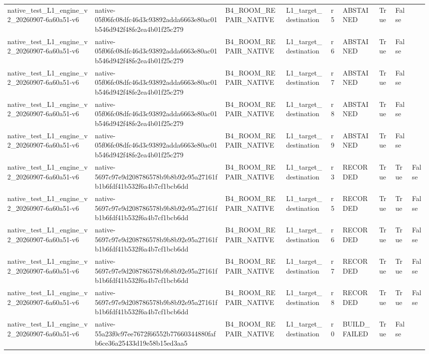 \begin{tabular}{lllllllll}
native\_test\_L1\_engine\_v2\_20260907-6a60a51-v6 & native-05f06fc08dfc46d3c93892adda6663e80ac01b546d942f48fe2ea4b01f25c279 & B4\_ROOM\_REPAIR\_NATIVE & L1\_target\_destination & r5 & ABSTAINED & True & False &  \\
native\_test\_L1\_engine\_v2\_20260907-6a60a51-v6 & native-05f06fc08dfc46d3c93892adda6663e80ac01b546d942f48fe2ea4b01f25c279 & B4\_ROOM\_REPAIR\_NATIVE & L1\_target\_destination & r6 & ABSTAINED & True & False &  \\
native\_test\_L1\_engine\_v2\_20260907-6a60a51-v6 & native-05f06fc08dfc46d3c93892adda6663e80ac01b546d942f48fe2ea4b01f25c279 & B4\_ROOM\_REPAIR\_NATIVE & L1\_target\_destination & r7 & ABSTAINED & True & False &  \\
native\_test\_L1\_engine\_v2\_20260907-6a60a51-v6 & native-05f06fc08dfc46d3c93892adda6663e80ac01b546d942f48fe2ea4b01f25c279 & B4\_ROOM\_REPAIR\_NATIVE & L1\_target\_destination & r8 & ABSTAINED & True & False &  \\
native\_test\_L1\_engine\_v2\_20260907-6a60a51-v6 & native-05f06fc08dfc46d3c93892adda6663e80ac01b546d942f48fe2ea4b01f25c279 & B4\_ROOM\_REPAIR\_NATIVE & L1\_target\_destination & r9 & ABSTAINED & True & False &  \\
native\_test\_L1\_engine\_v2\_20260907-6a60a51-v6 & native-5697c97e9d208786578b9b8b92e95a27161fb1b6fdf41b532f6a4b7cf1bcb6dd & B4\_ROOM\_REPAIR\_NATIVE & L1\_target\_destination & r3 & RECORDED & True & True & False \\
native\_test\_L1\_engine\_v2\_20260907-6a60a51-v6 & native-5697c97e9d208786578b9b8b92e95a27161fb1b6fdf41b532f6a4b7cf1bcb6dd & B4\_ROOM\_REPAIR\_NATIVE & L1\_target\_destination & r5 & RECORDED & True & True & False \\
native\_test\_L1\_engine\_v2\_20260907-6a60a51-v6 & native-5697c97e9d208786578b9b8b92e95a27161fb1b6fdf41b532f6a4b7cf1bcb6dd & B4\_ROOM\_REPAIR\_NATIVE & L1\_target\_destination & r6 & RECORDED & True & True & False \\
native\_test\_L1\_engine\_v2\_20260907-6a60a51-v6 & native-5697c97e9d208786578b9b8b92e95a27161fb1b6fdf41b532f6a4b7cf1bcb6dd & B4\_ROOM\_REPAIR\_NATIVE & L1\_target\_destination & r7 & RECORDED & True & True & False \\
native\_test\_L1\_engine\_v2\_20260907-6a60a51-v6 & native-5697c97e9d208786578b9b8b92e95a27161fb1b6fdf41b532f6a4b7cf1bcb6dd & B4\_ROOM\_REPAIR\_NATIVE & L1\_target\_destination & r8 & RECORDED & True & True & False \\
native\_test\_L1\_engine\_v2\_20260907-6a60a51-v6 & native-55a23f0c97ee7672f66552b77660344880fafb6ce36a25433d19e58b15ed3aa5 & B4\_ROOM\_REPAIR\_NATIVE & L1\_target\_destination & r0 & BUILD\_FAILED & True & False &  \\

\end{tabular}
